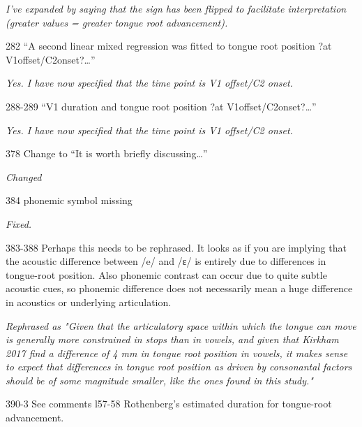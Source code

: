 \documentclass[]{article}
\begin{document}
\begin{adjustwidth}{1cm}{} \textit{
I've expanded by saying that the sign has been flipped to facilitate interpretation (greater values = greater tongue root advancement).
} \end{adjustwidth}

282 ``A second linear mixed regression was fitted to tongue root
position ?at V1offset/C2onset?\ldots{}''

\begin{adjustwidth}{1cm}{} \textit{
Yes. I have now specified that the time point is V1 offset/C2 onset.
} \end{adjustwidth}

288-289 ``V1 duration and tongue root position ?at
V1offset/C2onset?\ldots{}''

\begin{adjustwidth}{1cm}{} \textit{
Yes. I have now specified that the time point is V1 offset/C2 onset.
} \end{adjustwidth}

378 Change to ``It is worth briefly discussing\ldots{}''

\begin{adjustwidth}{1cm}{} \textit{
Changed
} \end{adjustwidth}

384 phonemic symbol missing

\begin{adjustwidth}{1cm}{} \textit{
Fixed.
} \end{adjustwidth}

383-388 Perhaps this needs to be rephrased. It looks as if you are
implying that the acoustic difference between /e/ and /ɛ/ is entirely
due to differences in tongue-root position. Also phonemic contrast can
occur due to quite subtle acoustic cues, so phonemic difference does not
necessarily mean a huge difference in acoustics or underlying
articulation.

\begin{adjustwidth}{1cm}{} \textit{
Rephrased as "Given that the articulatory space within which the tongue can move is generally more constrained in stops than in vowels, and given that Kirkham 2017 find a difference of 4 mm in tongue root position in vowels, it makes sense to expect that differences in tongue root position as driven by consonantal factors should be of some magnitude smaller, like the ones found in this study."
} \end{adjustwidth}

390-3 See comments l57-58 Rothenberg's estimated duration for
tongue-root advancement.
\end{document}
